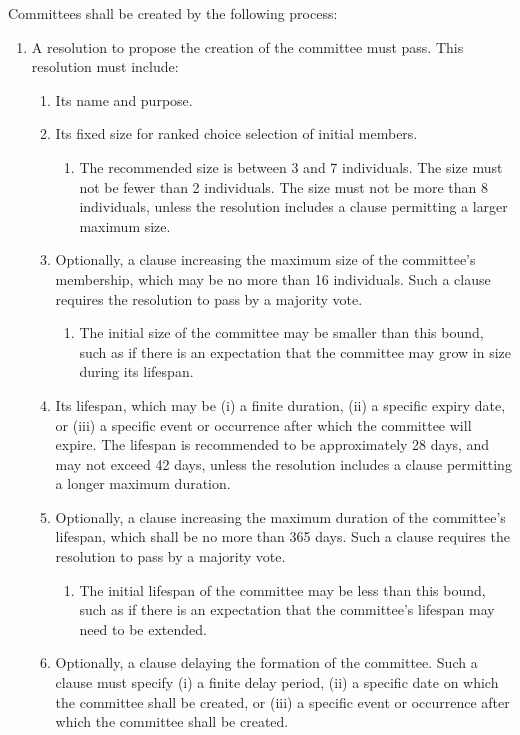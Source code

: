 \documentclass[11pt]{article}
\newcounter{h1}
\newcounter{h2}[h1]
\newcounter{h3}[h2]
\begin{document}

Committees shall be created by the following process:

\begin{enumerate}
  \item A resolution to propose the creation of the committee must pass. This resolution must include:  
  \begin{enumerate}
    \item Its name and purpose.  
    \item Its fixed size for ranked choice selection of initial members.  
    \begin{enumerate}
      \item The recommended size is between 3 and 7 individuals. The size must not be fewer than 2 individuals. The size must not be more than 8 individuals, unless the resolution includes a clause permitting a larger maximum size.  
    \end{enumerate}
    \item Optionally, a clause increasing the maximum size of the committee's membership, which may be no more than 16 individuals. Such a clause requires the resolution to pass by a majority vote.  
    \begin{enumerate}
      \item The initial size of the committee may be smaller than this bound, such as if there is an expectation that the committee may grow in size during its lifespan.  
    \end{enumerate}
    \item Its lifespan, which may be (i) a finite duration, (ii) a specific expiry date, or (iii) a specific event or occurrence after which the committee will expire. The lifespan is recommended to be approximately 28 days, and may not exceed 42 days, unless the resolution includes a clause permitting a longer maximum duration.  
    \item Optionally, a clause increasing the maximum duration of the committee's lifespan, which shall be no more than 365 days. Such a clause requires the resolution to pass by a majority vote.  
    \begin{enumerate}
      \item The initial lifespan of the committee may be less than this bound, such as if there is an expectation that the committee's lifespan may need to be extended.  
    \end{enumerate}
    \item Optionally, a clause delaying the formation of the committee. Such a clause must specify (i) a finite delay period, (ii) a specific date on which the committee shall be created, or (iii) a specific event or occurrence after which the committee shall be created.  

\end{enumerate}
\end{enumerate}
\end{document}
